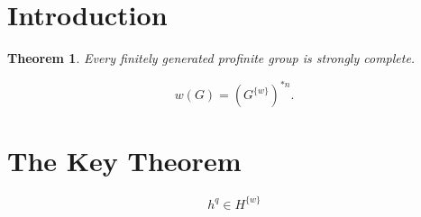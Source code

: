 \documentclass{article}
\newtheorem{theorem}{Theorem}[section]
\begin{document}
\section{Introduction}

\begin{theorem}
\label{strong}Every finitely generated profinite group is strongly complete.
\end{theorem}

\begin{equation}
w(G)=\left( G^{\{w\}}\right) ^{\ast n}. \label{w(G)bounded}
\end{equation}

\section{The Key Theorem}

\begin{equation}
h^{q}\in H^{\{w\}} \label{xpower}
\end{equation}
\end{document}
